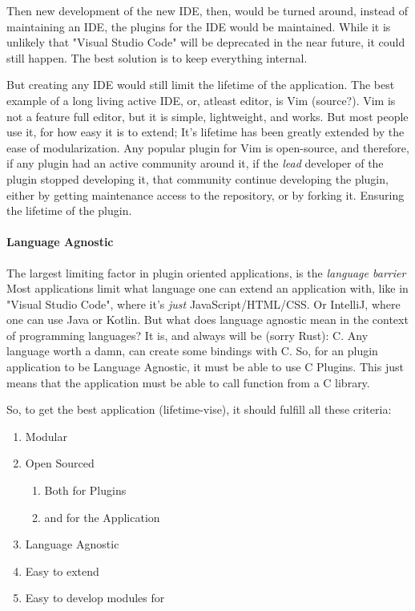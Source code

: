 Then new development of the new IDE, then, would be turned around, instead of
maintaining an IDE, the plugins for the IDE would be maintained. While it is
unlikely that "Visual Studio Code" will be deprecated in the near future, it
could still happen. The best solution is to keep everything internal.

But creating any IDE would still limit the lifetime of the application. The best
example of a long living active IDE, or, atleast editor, is Vim (source?). Vim
is not a feature full editor, but it is simple, lightweight, and works. But most
people use it, for how easy it is to extend; It's lifetime has been greatly
extended by the ease of modularization. Any popular plugin for Vim is
open-source, and therefore, if any plugin had an active community around it, if
the \textit{lead} developer of the plugin stopped developing it, that community
continue developing the plugin, either by getting maintenance access to the
repository, or by forking it. Ensuring the lifetime of the plugin.

\paragraph{Language Agnostic} The largest limiting factor in plugin oriented
applications, is the \textit{language barrier} Most applications limit what
language one can extend an application with, like in "Visual Studio Code", where
it's \textit{just} JavaScript/HTML/CSS. Or IntelliJ, where one can use Java or
Kotlin. But what does language agnostic mean in the context of programming
languages? It is, and always will be (sorry Rust): C. Any language worth a damn,
can create some bindings with C. So, for an plugin application to be Language
Agnostic, it must be able to use C Plugins. This just means that the application
must be able to call function from a C library.

So, to get the best application (lifetime-vise), it should fulfill all these criteria:

\begin{enumerate}
  \item Modular
  \item Open Sourced
    \begin{enumerate}
      \item Both for Plugins
      \item and for the Application
    \end{enumerate}
  \item Language Agnostic
  \item Easy to extend
  \item Easy to develop modules for
\end{enumerate}
